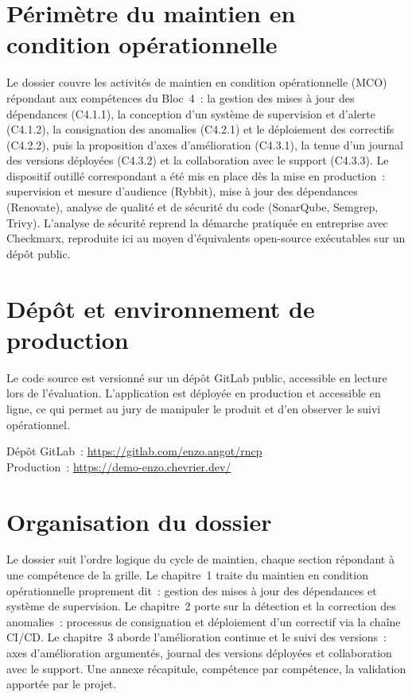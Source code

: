 \section*{Périmètre du maintien en condition opérationnelle}
Le dossier couvre les activités de maintien en condition opérationnelle (MCO) répondant aux compétences du Bloc~4~: la gestion des mises à jour des dépendances (C4.1.1), la conception d'un système de supervision et d'alerte (C4.1.2), la consignation des anomalies (C4.2.1) et le déploiement des correctifs (C4.2.2), puis la proposition d'axes d'amélioration (C4.3.1), la tenue d'un journal des versions déployées (C4.3.2) et la collaboration avec le support (C4.3.3). Le dispositif outillé correspondant a été mis en place dès la mise en production~: supervision et mesure d'audience (Rybbit), mise à jour des dépendances (Renovate), analyse de qualité et de sécurité du code (SonarQube, Semgrep, Trivy). L'analyse de sécurité reprend la démarche pratiquée en entreprise avec Checkmarx, reproduite ici au moyen d'équivalents open-source exécutables sur un dépôt public.

\section*{Dépôt et environnement de production}
Le code source est versionné sur un dépôt GitLab public, accessible en lecture lors de l'évaluation. L'application est déployée en production et accessible en ligne, ce qui permet au jury de manipuler le produit et d'en observer le suivi opérationnel.

\noindent Dépôt GitLab~: \url{https://gitlab.com/enzo.angot/rncp} \\
\noindent Production~: \url{https://demo-enzo.chevrier.dev/}

\section*{Organisation du dossier}
Le dossier suit l'ordre logique du cycle de maintien, chaque section répondant à une compétence de la grille. Le chapitre~1 traite du maintien en condition opérationnelle proprement dit~: gestion des mises à jour des dépendances et système de supervision. Le chapitre~2 porte sur la détection et la correction des anomalies~: processus de consignation et déploiement d'un correctif via la chaîne CI/CD. Le chapitre~3 aborde l'amélioration continue et le suivi des versions~: axes d'amélioration argumentés, journal des versions déployées et collaboration avec le support. Une annexe récapitule, compétence par compétence, la validation apportée par le projet.
